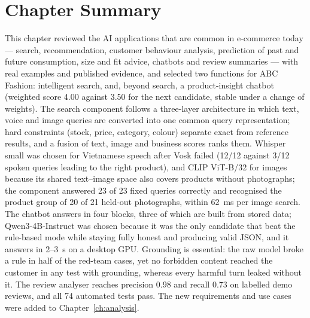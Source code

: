 \section{Chapter Summary}
This chapter reviewed the AI applications that are common in e-commerce today --- search, recommendation, customer behaviour analysis, prediction of past and future consumption, size and fit advice, chatbots and review summaries --- with real examples and published evidence, and selected two functions for ABC Fashion: intelligent search, and, beyond search, a product-insight chatbot (weighted score 4.00 against 3.50 for the next candidate, stable under a change of weights). The search component follows a three-layer architecture in which text, voice and image queries are converted into one common query representation; hard constraints (stock, price, category, colour) separate exact from reference results, and a fusion of text, image and business scores ranks them. Whisper small was chosen for Vietnamese speech after Vosk failed (12/12 against 3/12 spoken queries leading to the right product), and CLIP ViT-B/32 for images because its shared text--image space also covers products without photographs; the component answered 23 of 23 fixed queries correctly and recognised the product group of 20 of 21 held-out photographs, within 62~ms per image search. The chatbot answers in four blocks, three of which are built from stored data; Qwen3-4B-Instruct was chosen because it was the only candidate that beat the rule-based mode while staying fully honest and producing valid JSON, and it answers in 2--3~s on a desktop GPU. Grounding is essential: the raw model broke a rule in half of the red-team cases, yet no forbidden content reached the customer in any test with grounding, whereas every harmful turn leaked without it. The review analyser reaches precision 0.98 and recall 0.73 on labelled demo reviews, and all 74 automated tests pass. The new requirements and use cases were added to Chapter~\ref{ch:analysis}.
